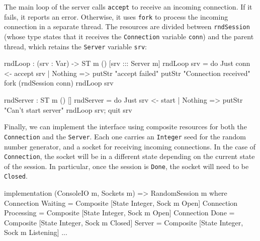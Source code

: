 The main loop of the server calls \texttt{accept} to receive an incoming
connection. If it fails, it reports an error. Otherwise, it uses
\texttt{fork} to process the incoming connection in a separate thread.
The resources are divided between \texttt{rndSession} (whose type states that
it receives the \texttt{Connection} variable \texttt{conn}) and the parent thread, which
retains the \texttt{Server} variable \texttt{srv}:

\small
\begin{code}
rndLoop : (srv : Var) -> ST m () [srv ::: Server {m}]
rndLoop srv = do Just conn <- accept srv | Nothing => putStr "accept failed\n"
                 putStr "Connection received\n"
                 fork (rndSession conn)
                 rndLoop srv
  
rndServer : ST m () []
rndServer = do Just srv <- start | Nothing => putStr "Can't start server\n"
               rndLoop srv; quit srv
\end{code}
\normalsize

Finally, we can implement the interface using composite resources for both
the \texttt{Connection} and the \texttt{Server}. Each one carries an
\texttt{Integer} seed for the random number generator, and a socket for
receiving incoming connections. In the case of \texttt{Connection}, the socket
will be in a different state depending on the current state of the session. In
particular, once the session is \texttt{Done}, the socket will need to be
\texttt{Closed}.

\small
\begin{code}
implementation (ConsoleIO m, Sockets m) => RandomSession m where
  Connection Waiting = Composite [State Integer, Sock {m} Open]
  Connection Processing = Composite [State Integer, Sock {m} Open]
  Connection Done = Composite [State Integer, Sock {m} Closed]
  Server = Composite [State Integer, Sock {m} Listening]
  ...
\end{code}
\normalsize

